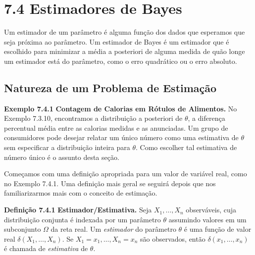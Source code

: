 \section*{7.4 Estimadores de Bayes}
Um estimador de um parâmetro é alguma função dos dados que esperamos que seja próxima ao parâmetro. Um estimador de Bayes é um estimador que é escolhido para minimizar a média a posteriori de alguma medida de quão longe um estimador está do parâmetro, como o erro quadrático ou o erro absoluto.

\subsection*{Natureza de um Problema de Estimação}

\noindent\textbf{Exemplo 7.4.1} \quad \textbf{Contagem de Calorias em Rótulos de Alimentos.} No Exemplo 7.3.10, encontramos a distribuição a posteriori de $\theta$, a diferença percentual média entre as calorias medidas e as anunciadas. Um grupo de consumidores pode desejar relatar um único número como uma estimativa de $\theta$ sem especificar a distribuição inteira para $\theta$. Como escolher tal estimativa de número único é o assunto desta seção.

Começamos com uma definição apropriada para um valor de variável real, como no Exemplo 7.4.1. Uma definição mais geral se seguirá depois que nos familiarizarmos mais com o conceito de estimação.

\vspace{1cm}
\noindent\textbf{Definição 7.4.1} \quad \textbf{Estimador/Estimativa.} Seja $X_1, \dots, X_n$ observáveis, cuja distribuição conjunta é indexada por um parâmetro $\theta$ assumindo valores em um subconjunto $\Omega$ da reta real. Um \textit{estimador} do parâmetro $\theta$ é uma função de valor real $\delta(X_1, \dots, X_n)$. Se $X_1=x_1, \dots, X_n=x_n$ são observados, então $\delta(x_1, \dots, x_n)$ é chamada de \textit{estimativa} de $\theta$.

